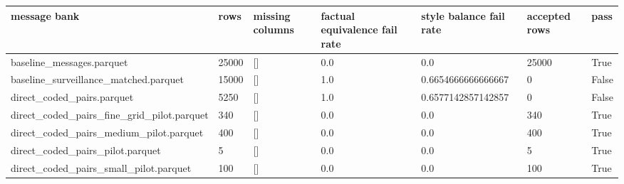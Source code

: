 \begin{tabular}{lllllll}
\toprule
message bank & rows & missing columns & factual equivalence fail rate & style balance fail rate & accepted rows & pass \\
\midrule
baseline\_messages.parquet & 25000 & [] & 0.0 & 0.0 & 25000 & True \\
baseline\_surveillance\_matched.parquet & 15000 & [] & 1.0 & 0.6654666666666667 & 0 & False \\
direct\_coded\_pairs.parquet & 5250 & [] & 1.0 & 0.6577142857142857 & 0 & False \\
direct\_coded\_pairs\_fine\_grid\_pilot.parquet & 340 & [] & 0.0 & 0.0 & 340 & True \\
direct\_coded\_pairs\_medium\_pilot.parquet & 400 & [] & 0.0 & 0.0 & 400 & True \\
direct\_coded\_pairs\_pilot.parquet & 5 & [] & 0.0 & 0.0 & 5 & True \\
direct\_coded\_pairs\_small\_pilot.parquet & 100 & [] & 0.0 & 0.0 & 100 & True \\
\bottomrule
\end{tabular}
